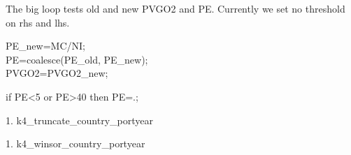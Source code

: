 

\usepackage[T1]{fontenc}




\thispagestyle{fancy}

\newcommand{\code}{\texttt}
\newcommand*{\Commonpath}{20190603}

The big loop tests old and new PVGO2 and PE.
Currently we set no threshold on rhs and lhs.

PE\_new=MC/NI;\\
PE=coalesce(PE\_old, PE\_new);\\
PVGO2=PVGO2\_new;

if PE<5 or PE>40 then PE=.;

1. k4\_truncate\_country\_portyear




1. k4\_winsor\_country\_portyear







